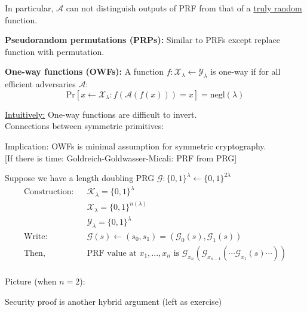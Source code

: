 \documentclass{article}
\begin{document}


In particular, $\mathcal{A}$ can not distinguish outputs of PRF from that of a \underline{truly random} function.

\textbf{Pseudorandom permutations (PRPs):} Similar to PRFs except replace function with permutation.

\textbf{One-way functions (OWFs):} A function $f:\mathcal{X}_{\lambda} \leftarrow \mathcal{Y}_{\lambda}$ is one-way if for all efficient adversaries $\mathcal{A}$:
\begin{equation*}
    \mathrm{Pr}[x \leftarrow \mathcal{X}_{\lambda}: f(\mathcal{A}(f(x)))=x] = \mathrm{negl}(\lambda)
\end{equation*}

\underline{Intuitively:} One-way functions are difficult to invert.
\\

Connections between symmetric primitives:



Implication: OWFs is minimal assumption for symmetric cryptography.
\\

{\color{purple} [If there is time: Goldreich-Goldwasser-Micali: PRF from PRG]}

Suppose we have a length doubling PRG $\mathcal{G}:\{ 0,1 \}^{\lambda} \leftarrow \{ 0,1 \}^{2\lambda}$ 
\begin{eqnarray*}
    \text{Construction:} & & \mathcal{K}_{\lambda} = \{ 0,1 \}^{\lambda} \\ 
    & & \mathcal{X}_{\lambda} = \{ 0,1 \}^{n(\lambda)} \\ 
    & & \mathcal{Y}_{\lambda} = \{ 0,1 \}^{\lambda} \\ 
    \text{Write:} & & \mathcal{G}(s) \leftarrow (s_0,s_1) = (\mathcal{G}_0(s),\mathcal{G}_1(s)) \\
    \text{Then,} & & \text{PRF value at } x_1,...,x_n \text{ is } \mathcal{G}_{x_n}(\mathcal{G}_{x_{n-1}}(\cdots \mathcal{G}_{x_1}(s) \cdots)) \\ 
\end{eqnarray*}

Picture (when $n=2$):

Security proof is another hybrid argument (left as exercise)
\end{document}

